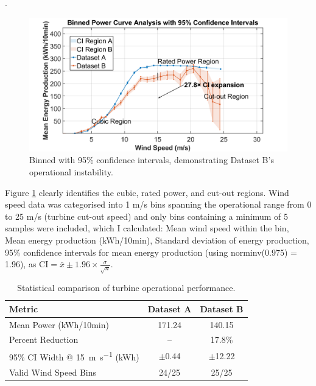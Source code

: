 .\documentclass[a4paper,11pt]{article}
\begin{document}
 
\begin{figure}[h!]
    \centering
    \includegraphics[width=\textwidth]{photo/Figure2_BinnedAnalysis.png}
    \caption{Binned with 95\% confidence intervals, demonstrating Dataset B's operational instability.}
    \label{fig:binned}
\end{figure}
 

Figure \ref{fig:binned} clearly identifies the cubic, rated power, and cut-out regions. Wind speed data was categorised into 1 m/s bins spanning the operational range from 0 to 25 m/s (turbine cut-out speed) and only bins containing a minimum of 5 samples were included, which I calculated: Mean wind speed within the bin, Mean energy production (kWh/10min), Standard deviation of energy production,
95\% confidence intervals for mean energy production (using norminv(0.975) = 1.96), as $\text{CI} = \bar{x} \pm 1.96 \times \frac{\sigma}{\sqrt{n}}$.

 

\begin{table}[ht]
\centering
\begin{tabular}{lcc}
\toprule
\textbf{Metric} & \textbf{Dataset A} & \textbf{Dataset B} \\
\midrule
Mean Power (\si{kWh/10min}) & 171.24 & 140.15 \\
Percent Reduction & -- & 17.8\% \\
95\% CI Width @ \SI{15}{\metre\per\second} (\si{kWh}) & $\pm$0.44 & $\pm$12.22 \\
Valid Wind Speed Bins & 24/25 & 25/25 \\
\bottomrule
\end{tabular}
\caption{Statistical comparison of turbine operational performance.}
\label{tab:stats_comparison}
\end{table}

 
\end{document}

